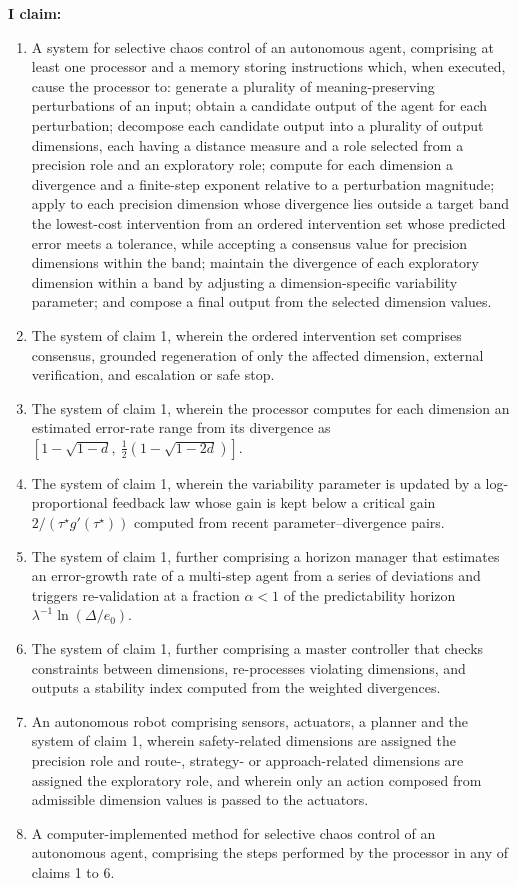 \documentclass[12pt,a4paper]{article}
\newcounter{para}
\begin{document}
\textbf{I claim:}
\begin{enumerate}[label=\arabic*.]
\item A system for selective chaos control of an autonomous agent, comprising at least one processor and a memory storing instructions which, when executed, cause the processor to: generate a plurality of meaning-preserving perturbations of an input; obtain a candidate output of the agent for each perturbation; decompose each candidate output into a plurality of output dimensions, each having a distance measure and a role selected from a precision role and an exploratory role; compute for each dimension a divergence and a finite-step exponent relative to a perturbation magnitude; apply to each precision dimension whose divergence lies outside a target band the lowest-cost intervention from an ordered intervention set whose predicted error meets a tolerance, while accepting a consensus value for precision dimensions within the band; maintain the divergence of each exploratory dimension within a band by adjusting a dimension-specific variability parameter; and compose a final output from the selected dimension values.
\item The system of claim 1, wherein the ordered intervention set comprises consensus, grounded regeneration of only the affected dimension, external verification, and escalation or safe stop.
\item The system of claim 1, wherein the processor computes for each dimension an estimated error-rate range from its divergence as $[1-\sqrt{1-d},\ \tfrac12(1-\sqrt{1-2d})]$.
\item The system of claim 1, wherein the variability parameter is updated by a log-proportional feedback law whose gain is kept below a critical gain $2/(\tau^\star g'(\tau^\star))$ computed from recent parameter--divergence pairs.
\item The system of claim 1, further comprising a horizon manager that estimates an error-growth rate of a multi-step agent from a series of deviations and triggers re-validation at a fraction $\alpha<1$ of the predictability horizon $\lambda^{-1}\ln(\Delta/e_0)$.
\item The system of claim 1, further comprising a master controller that checks constraints between dimensions, re-processes violating dimensions, and outputs a stability index computed from the weighted divergences.
\item An autonomous robot comprising sensors, actuators, a planner and the system of claim 1, wherein safety-related dimensions are assigned the precision role and route-, strategy- or approach-related dimensions are assigned the exploratory role, and wherein only an action composed from admissible dimension values is passed to the actuators.
\item A computer-implemented method for selective chaos control of an autonomous agent, comprising the steps performed by the processor in any of claims 1 to 6.
\end{enumerate}
\end{document}
